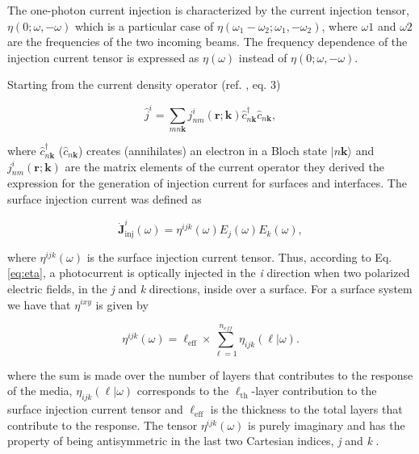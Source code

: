 \documentclass[pss]{wiley2sp} %
\begin{document}
\begin{changed}
The one-photon current injection is characterized by the current injection tensor, $\eta(0;\omega,-\omega)$ which is a particular case of $\eta(\omega_{1}-\omega_{2};\omega_{1},-\omega_{2})$, where $\omega{1}$ and $\omega{2}$ are the frequencies of the two incoming beams. The frequency dependence of the injection current tensor is expressed as $\eta(\omega)$ instead of $\eta(0;\omega,-\omega)$.
\end{changed}

Starting from the current density operator (ref. \cite{cabellos2011optical}, eq. 3)

\begin{equation}
    \hat{j}^{i} = \sum_{mn\textbf{k}} j^{i}_{nm}(\textbf{r};\textbf{k}) \hat{c}^{\dagger}_{n\textbf{k}} \hat{c}_{n\textbf{k}},
\end{equation}

\noindent where $\hat{c}^{\dagger}_{n\textbf{k}} $ ($\hat{c}_{n\textbf{k}} $) creates (annihilates) an electron in a Bloch state $\vert n\textbf{k} \rangle $ and $j^{i}_{nm}(\textbf{r};\textbf{k}) $ are the matrix elements of the current operator they derived the expression for the generation of injection current for surfaces
and interfaces. The surface injection current was defined as

\begin{equation}
    \mathbf{\dot{J}}^{i}_{\text{inj}}(\omega) =
    \eta^{ijk}(\omega)E_{j}(\omega)E_{k}(\omega), \label{eq:eta}
\end{equation}

\noindent where $\eta^{ijk}(\omega)$ is the surface injection current tensor.
Thus, according to Eq. \ref{eq:eta}, a photocurrent is optically injected in
the \emph{i} direction when two polarized electric fields, in the \emph{j} and
\emph{k} directions, inside over a surface. For a surface system we have that
{$\eta^{ixy}$} is given by \cite{cabellos2011optical,arzate2014optical}

\begin{equation}
    \eta^{ijk} (\omega) = \ell_{\text{eff}} \times \sum_{\ell=1}^{n_{eff}}
    \eta_{ijk} (\ell|\omega). \label{eq:etaeff}
\end{equation}

\noindent where the sum is made over the number of layers that contributes to
the response of the media, $\eta_{ijk} (\ell|\omega)$ corresponds to the
$\ell_{\text{th}}$-layer contribution to the surface injection current tensor
and $\ell_{\text{eff}}$ is the thickness to the total layers that contribute to
the response. The tensor $\eta^{ijk}(\omega)$ is purely imaginary and has the
property of being antisymmetric in the last two Cartesian indices, \emph{j} and
\emph{k} \cite{sipe2000second,nastos2006optical}.
\end{document}
